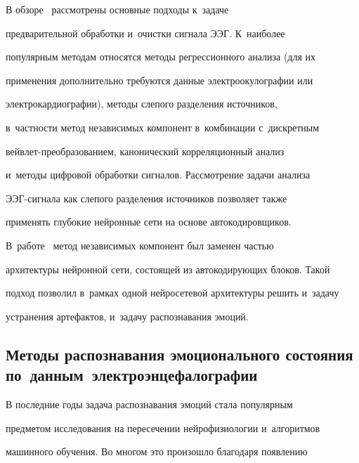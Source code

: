      

     \vspace*{-2pt}

     

     В обзоре~\cite{8-sha} рассмотрены основные подходы к~задаче 

предварительной обработки и~очистки сигнала ЭЭГ. К~наиболее 

популярным методам относятся методы регрессионного анализа (для их 

применения дополнительно требуются данные электроокулографии или 

электрокардиографии), методы слепого разделения источников,  

в~част\-ности метод независимых компонент в~комбинации с~дискретным  

вейв\-лет-пре\-об\-ра\-зо\-ва\-ни\-ем, канонический корреляционный анализ 

и~методы циф\-ро\-вой обработки сигналов. Рассмотрение задачи анализа  

ЭЭГ-сиг\-на\-ла как слепого разделения источников позволяет также 

применять глубокие нейронные сети на основе автокодировщиков. 

В~работе~\cite{9-sha} метод независимых компонент был заменен частью 

архитектуры нейронной сети, состоящей из ав\-то\-ко\-ди\-ру\-ющих блоков. Такой 

подход позволил в~рамках одной нейросетевой архитектуры решить и~задачу 

устранения артефактов, и~задачу распознавания эмоций. 



\vspace*{-2pt}



\subsection{Методы распознавания эмоционального состояния по~данным~электроэнцефалографии}



\vspace*{-2pt}

     

     В последние годы задача распознавания эмоций стала популярным 

предметом исследования на пересечении нейрофизиологии и~алгоритмов 

машинного обучения. Во многом это произошло благодаря появлению 

